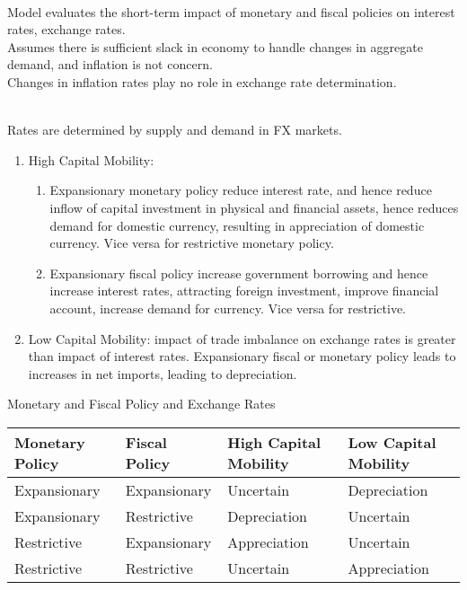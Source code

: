 \begin{definition} \\
Model evaluates the short-term impact of monetary and fiscal policies on interest rates, exchange rates.\\
Assumes there is sufficient slack in economy to handle changes in aggregate demand, and inflation is not concern.\\
Changes in inflation rates play no role in exchange rate determination.
\end{definition}

\begin{remark} \\
Rates are determined by supply and demand in FX markets. 
\begin{enumerate}[label=\roman*.]
\setlength{\itemsep}{0pt}
\item High Capital Mobility:
\begin{enumerate}[label=\arabic*.]
\setlength{\itemsep}{0pt}
\item Expansionary monetary policy reduce interest rate, and hence reduce inflow of capital investment in physical and financial assets, hence reduces demand for domestic currency, resulting in appreciation of domestic currency. Vice versa for restrictive monetary policy.
\item Expansionary fiscal policy increase government borrowing and hence increase interest rates, attracting foreign investment, improve financial account, increase demand for currency. Vice versa for restrictive.
\end{enumerate}
\item Low Capital Mobility: impact of trade imbalance on exchange rates is greater than impact of interest rates. Expansionary fiscal or monetary policy leads to increases in net imports, leading to depreciation.
\end{enumerate}
\end{remark}

\begin{flushleft}
Monetary and Fiscal Policy and Exchange Rates
\begin{tabularx}{\textwidth}{p{10em}|p{10em}|X|X}
\hline
\rowcolor{gray!30}
Monetary Policy & Fiscal Policy & High Capital Mobility & Low Capital Mobility\\
\hline
Expansionary & Expansionary & Uncertain & Depreciation\\
\hline
Expansionary & Restrictive & Depreciation & Uncertain\\
\hline
Restrictive & Expansionary & Appreciation & Uncertain\\
\hline
Restrictive & Restrictive & Uncertain & Appreciation\\
\hline
\end{tabularx}
\end{flushleft}

